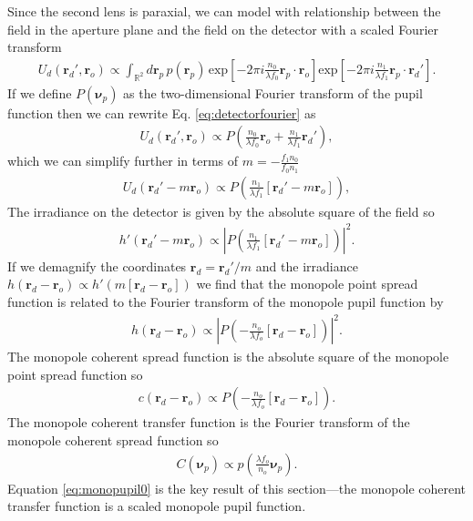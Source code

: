 \documentclass[]{osa-article}
\providecommand{\ro}{\mathbf{\mathbf{r}}_o}
\providecommand{\rp}{\mathbf{r}_p}
\providecommand{\rd}{\mathbf{r}_d}
\providecommand{\mbb}[1]{\mathbb{#1}}
\providecommand{\bs}[1]{\boldsymbol{#1}}
\providecommand{\bvp}{\bs{\nu}_p}
\begin{document}
Since the second lens is paraxial, we can model with relationship between the
field in the aperture plane and the field on the detector with a scaled Fourier
transform \cite{goodman1996}
\begin{align}
   U_d(\rd', \ro) \propto \int_{\mbb{R}^2}d\rp\, p(\rp)\,\text{exp}\left[-2\pi i \frac{n_0}{\lambda f_0} \rp\cdot\ro \right]\text{exp}\left[-2\pi i \frac{n_1}{\lambda f_1} \rp\cdot\rd' \right]. \label{eq:detectorfourier}
\end{align}
If we define $P(\bvp)$ as the two-dimensional Fourier transform of the pupil function
then we can rewrite Eq. \ref{eq:detectorfourier} as
\begin{align}
  U_d(\rd', \ro) \propto P\left(\frac{n_0}{\lambda f_0}\ro + \frac{n_1}{\lambda f_1}\rd'\right),
\end{align}
which we can simplify further in terms of $m = -\frac{f_1n_0}{f_0n_1}$
\begin{align}
  U_d(\rd' - m\ro) \propto P\left(\frac{n_1}{\lambda f_1}[\rd' - m\ro]\right),
\end{align}
The irradiance on the detector is given by the absolute square of the field so
\begin{align}
  h'(\rd' - m\ro) \propto \left|P\left(\frac{n_1}{\lambda f_1}[\rd' - m\ro]\right)\right|^2.
\end{align}
If we demagnify the coordinates $\rd = \rd'/m$ and the irradiance
$h(\rd - \ro) \propto h'(m[\rd - \ro])$ we find that the monopole point spread function
is related to the Fourier transform of the monopole pupil function by
\begin{align}
  h(\rd - \ro) \propto \left|P\left(-\frac{n_o}{\lambda f_o}[\rd - \ro]\right)\right|^2.
\end{align}
The monopole coherent spread function is the absolute square of the monopole point spread function so
\begin{align}
  c(\rd - \ro) \propto P\left(-\frac{n_o}{\lambda f_o}[\rd - \ro]\right).
\end{align}
The monopole coherent transfer function is the Fourier transform of the monopole coherent spread function so
\begin{align}
  C(\bvp) \propto p\left(\frac{\lambda f_o}{n_o}\bvp\right). \label{eq:monopupil0}
\end{align}
Equation \ref{eq:monopupil0} is the key result of this section---the monopole
coherent transfer function is a scaled monopole pupil function.
\end{document}
